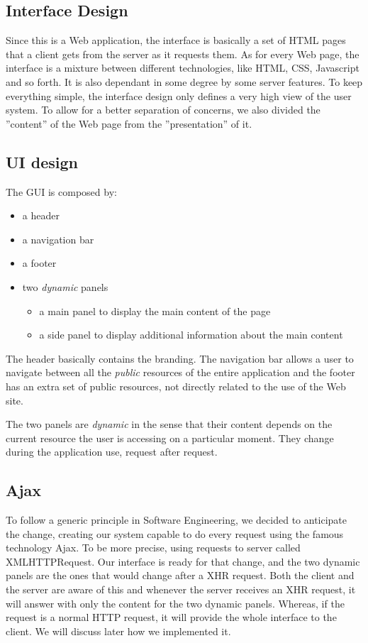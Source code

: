 \documentclass[12pt]{report}
\begin{document}
\begin{itemize}
\section{Interface Design}
Since this is a Web application, the interface is basically a set of HTML pages that a client gets from the server as it requests them. As for every Web page, the interface is a mixture between different technologies, like HTML, CSS, Javascript and so forth. It is also dependant in some degree by some server features. To keep everything simple, the interface design only defines a very high view of the user system. To allow for a better separation of concerns, we also divided the ''content'' of the Web page from the ''presentation'' of it.
\subsection{UI design}
The GUI is composed by:
\begin{itemize}
\item a header
\item a navigation bar
\item a footer
\item two \emph{dynamic} panels
	\begin{itemize}
	\item a main panel to display the main content of the page
    \item a side panel to display additional information about the main content
	\end{itemize}
\end{itemize}
The header basically contains the branding. The navigation bar allows a user to navigate between all the \emph{public} resources of the entire application and the footer has an extra set of public resources, not directly related to the use of the Web site.

The two panels are \emph{dynamic} in the sense that their content depends on the current resource the user is accessing on a particular moment. They change during the application use, request after request.

\subsection{Ajax}
To follow a generic principle in Software Engineering, we decided to anticipate the change, creating our system capable to do every request using the famous technology Ajax. To be more precise, using requests to server called XMLHTTPRequest. Our interface is ready for that change, and the two dynamic panels are the ones that would change after a XHR request. Both the client and the server are aware of this and whenever the server receives an XHR request, it will answer with only the content for the two dynamic panels. Whereas, if the request is a normal HTTP request, it will provide the whole interface to the client. We will discuss later how we implemented it.


\end{itemize}
\end{document}
